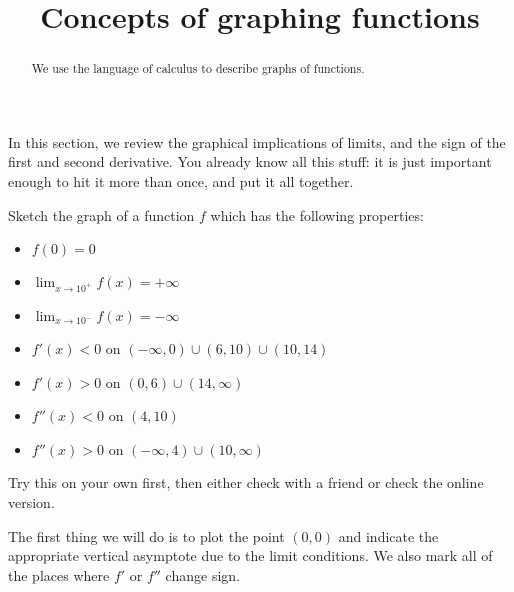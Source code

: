 \documentclass{ximera}
\title[Dig-In:]{Concepts of graphing functions}
\begin{document}
\begin{abstract}
  We use the language of calculus to describe graphs of functions.
\end{abstract}
\maketitle

In this section, we review the graphical implications of limits, and
the sign of the first and second derivative.  You already know all
this stuff: it is just important enough to hit it more than once, and
put it all together.

\begin{example}
  Sketch the graph of a function $f$ which has the following properties:
  \begin{itemize}
  \item $f(0)=0$
  \item $\lim_{x \to 10^+} f(x) = +\infty$
  \item $\lim_{x \to 10^-} f(x) = -\infty$
  \item $f'(x)<0$ on $(-\infty,0) \cup (6,10) \cup (10,14)$
  \item $f'(x)>0$ on $(0,6) \cup (14,\infty)$
  \item $f''(x)<0$ on $(4,10)$
  \item $f''(x)>0$ on $(-\infty,4) \cup (10,\infty)$
  \end{itemize}
  \begin{explanation}
    Try this on your own first, then either check with a friend or
    check the online version.
    
    \begin{hint}
      The first thing we will do is to plot the point $(0,0)$ and
      indicate the appropriate vertical asymptote due to the limit
      conditions.  We also mark all of the places where $f'$ or $f''$
      change sign.
      

\end{hint}
\end{explanation}
\end{example}
\end{document}
